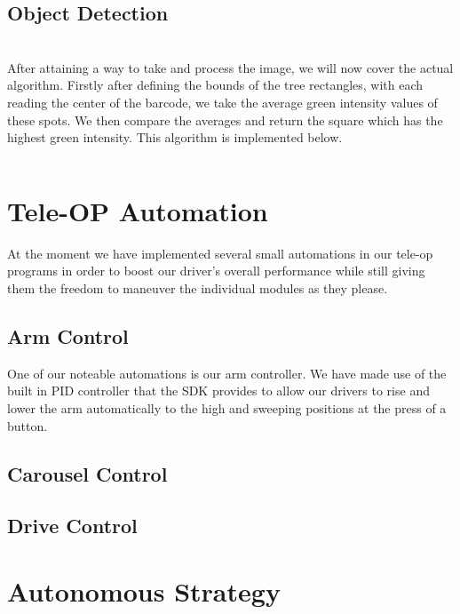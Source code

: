 \documentclass[a4paper,12pt]{article}
\begin{document}
\subsection{Object Detection}
\\ 
After attaining a way to take and process the image, we will now cover the actual algorithm. Firstly after defining the bounds of the tree rectangles, with each reading the center of the barcode, we take the average green intensity values of these spots. We then compare the averages and return the square which has the highest green intensity. This algorithm is implemented below. \\ 
\inputminted[linenos, numbersep=5pt, tabsize=4, frame=lines, label=Image Segmentation, escapeinside=||,mathescape=true]{java}{{CodeFiles/Vuforia2.java}}



\newpage
\thispagestyle{empty}
\newpage
\thispagestyle{empty}
\section{Tele-OP Automation}
At the moment we have implemented several small automations in our tele-op programs in order to boost our driver's overall performance while still giving them the freedom to maneuver the individual modules as they please. 
\subsection{Arm Control}
One of our noteable automations is our arm controller. We have made use of the built in PID controller that the SDK provides to allow our drivers to rise and lower the arm automatically to the high and sweeping positions at the press of a button. 
\subsection{Carousel Control}

\subsection{Drive Control}

\newpage
\thispagestyle{empty}

\section{Autonomous Strategy}
\end{document}
